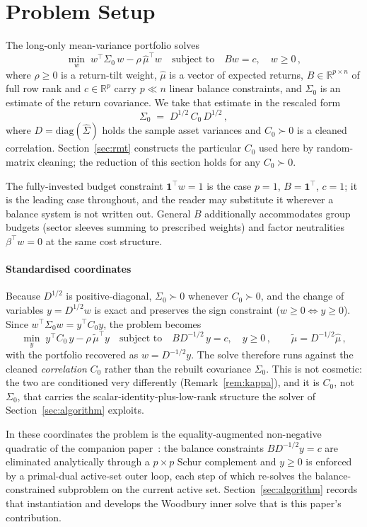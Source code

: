 \section{Problem Setup}\label{sec:problem}

The long-only mean-variance portfolio solves
\[
  \min_{w}\; w^\top \Sigma_0\, w - \rho\,\hat\mu^\top w
  \quad\text{subject to}\quad
  Bw = c,\quad w \geq 0\,,
\]
where $\rho \geq 0$ is a return-tilt weight, $\hat\mu$ is a vector of expected
returns, $B \in \mathbb{R}^{p \times n}$ of full row rank and $c \in \mathbb{R}^p$
carry $p \ll n$ linear balance constraints, and $\Sigma_0$ is an estimate of the
return covariance. We take that estimate in the rescaled form
\[
  \Sigma_0 \;=\; D^{1/2}\, C_0\, D^{1/2}\,,
\]
where $D = \mathrm{diag}(\hat\Sigma)$ holds the sample asset variances and
$C_0 \succ 0$ is a cleaned correlation. Section~\ref{sec:rmt} constructs the
particular $C_0$ used here by random-matrix cleaning; the reduction of this
section holds for any $C_0 \succ 0$.

The fully-invested budget constraint $\mathbf{1}^\top w = 1$ is the case $p = 1$,
$B = \mathbf{1}^\top$, $c = 1$; it is the leading case throughout, and the reader
may substitute it wherever a balance system is not written out. General $B$
additionally accommodates group budgets (sector sleeves summing to prescribed
weights) and factor neutralities $\beta^\top w = 0$ at the same cost structure.

\paragraph{Standardised coordinates}
Because $D^{1/2}$ is positive-diagonal, $\Sigma_0 \succ 0$ whenever
$C_0 \succ 0$, and the change of variables $y = D^{1/2} w$ is exact and preserves
the sign constraint ($w \geq 0 \Leftrightarrow y \geq 0$). Since
$w^\top \Sigma_0 w = y^\top C_0 y$, the problem becomes
\[
  \min_{y}\; y^\top C_0\, y - \rho\,\tilde\mu^\top y
  \quad\text{subject to}\quad
  B D^{-1/2}\, y = c,\quad y \geq 0\,,
  \qquad \tilde\mu = D^{-1/2}\hat\mu\,,
\]
with the portfolio recovered as $w = D^{-1/2} y$. The solve therefore runs
against the cleaned \emph{correlation} $C_0$ rather than the rebuilt covariance
$\Sigma_0$. This is not cosmetic: the two are conditioned very differently
(Remark~\ref{rem:kappa}), and it is $C_0$, not $\Sigma_0$, that carries the
scalar-identity-plus-low-rank structure the solver of
Section~\ref{sec:algorithm} exploits.

In these coordinates the problem is the equality-augmented non-negative
quadratic of the companion paper~\cite{schmelzer2026nncg}: the balance
constraints $B D^{-1/2} y = c$ are eliminated analytically through a
$p \times p$ Schur complement and $y \geq 0$ is enforced by a primal-dual
active-set outer loop, each step of which re-solves the balance-constrained
subproblem on the current active set. Section~\ref{sec:algorithm} records that
instantiation and develops the Woodbury inner solve that is this paper's
contribution.
